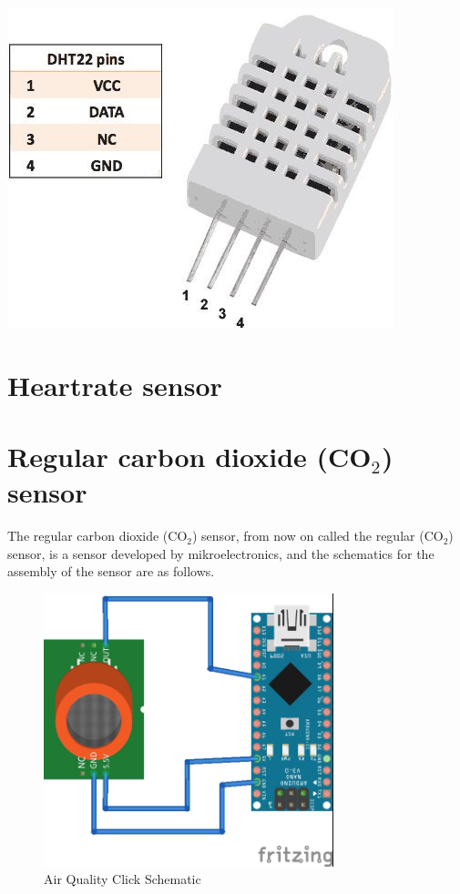 \documentclass{report}
\begin{document}
\includegraphics[scale=0.25]{images/DHT22.jpg}


\chapter{Heartrate sensor}

\chapter{Regular carbon dioxide (CO$_2$) sensor}
The regular carbon dioxide (CO$_2$) sensor, from now on called the regular (CO$_2$) sensor, is a sensor developed by mikroelectronics, and the schematics for the assembly of the sensor are as follows. \\

\begin{figure}[H]
	\centering
\includegraphics[width=0.75\textwidth]{images/Mikroe-Gas-sensor-schematic.jpg}
	\caption{Air Quality Click Schematic}
\end{figure}
\end{document}
